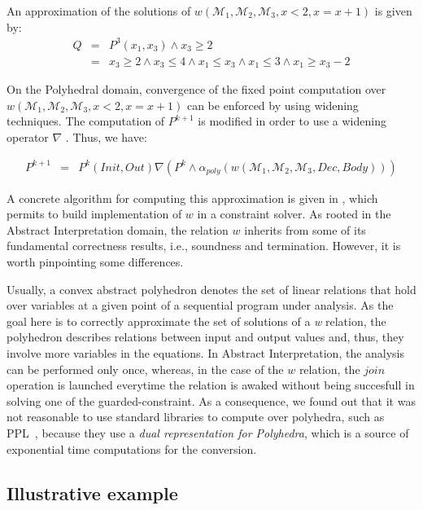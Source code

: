 \documentclass[submission,copyright,creativecommons]{eptcs}
\newcommand{\M}{\mathcal{M}}
\begin{document}
\noindent
An approximation of the solutions of $w(\M_1, \M_2, \M_3, x < 2, x=x+1)$ is given by: 
\begin{eqnarray*}
Q &=& P^3(x_1,x_3) \land x_3 \geq 2 \\
  &=& x_3 \geq 2 \land x_3 \leq 4 \land x_1 \leq x_3 \land x_1 \leq 3 \land  x_1 \geq x_3 - 2
\end{eqnarray*}

\noindent
On the Polyhedral domain, convergence of the fixed point computation over $w(\M_1, \M_2, \M_3, x < 2, x=x+1)$ can be enforced by using widening techniques.
The computation of $P^{k+1}$ is modified in order to use a widening operator $\nabla$ \cite{CH78}. Thus, we have: 

\begin{eqnarray*}
P^{k+1} &=& P^k(Init,Out) \nabla (P^k \land  \alpha_{poly}(w(\M_1,\M_2, \M_3, Dec,Body))) 
\end{eqnarray*}










\noindent
A concrete algorithm for computing this approximation is given in \cite{DGD07a}, which permits to build implementation of $w$ in a constraint solver. As rooted in the Abstract Interpretation domain, the relation $w$ inherits from some of its fundamental correctness results, i.e., soundness and termination.  However, it is worth pinpointing some differences.

\noindent
Usually, a convex abstract polyhedron denotes the set of linear relations that hold
over variables at a given point of a sequential program under analysis. 
As the goal here is to correctly approximate the set of solutions of a \textit{w} relation, the polyhedron describes
relations between input and output values and, thus, they
involve more variables in the equations. In Abstract Interpretation, the
analysis can be performed only once, whereas, in the case of the $w$ relation, the $join$ operation is launched everytime the relation is awaked without being succesfull in solving one of the guarded-constraint.
As a consequence, we found out that it was not reasonable to use standard libraries to compute over polyhedra, such as PPL~\cite{BRZ02}, 
because they use a {\it dual representation for Polyhedra}, which is a source of exponential time
computations for the conversion.  

\subsection{Illustrative example}
\end{document}
